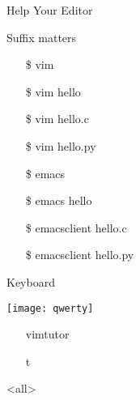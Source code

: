 \begin{frame}{Help Your Editor}
  \begin{iblock}{Suffix matters}\ttfamily
    \begin{itemize}
    \item[\$] vim \wrong
    \item[\$] vim hello \wrong
    \item[\$] vim hello.c  \correct
    \item[\$] vim hello.py \correct
    \item[\$] emacs \wrong
    \item[\$] emacs hello \wrong
    \item[\$] emacsclient hello.c  \correct
    \item[\$] emacsclient hello.py \correct
    \end{itemize}
  \end{iblock}
\end{frame}

\begin{frame}{Keyboard}
  \begin{center}
    \texttt{[image: qwerty]}
  \end{center}
  \begin{itemize}
  \item[\vim] vimtutor
  \item[\emacs] \Ch{} {\kbd t}
  \end{itemize}
\end{frame}



\mode<all>
